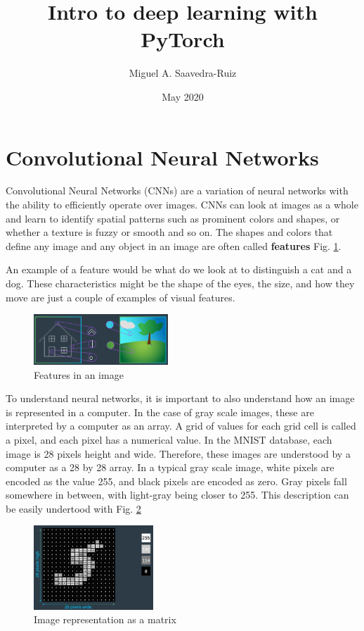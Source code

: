 \documentclass{article}
\title{Intro to deep learning with PyTorch}
\author{Miguel A. Saavedra-Ruiz}
\date{May 2020}
\begin{document}
\maketitle

\section*{Convolutional Neural Networks}

Convolutional Neural Networks (CNNs) are a variation of neural networks with the ability to efficiently operate over images. CNNs can look at images as a whole and learn to identify spatial patterns such as prominent colors and shapes, or whether a texture is fuzzy or smooth and so on. The shapes and colors that define any image and any object in an image are often called \textbf{features} Fig. \ref{fig:f1}.

An example of a feature would be what do we look at to distinguish a cat and a dog. These characteristics might be the shape of the eyes, the size, and how they move are just a couple of examples of visual features. 

\begin{figure}[ht]
    \centering
    \includegraphics[width=0.45\textwidth,height=0.45\textheight,keepaspectratio]{images/features.png}
    \captionsetup{justification=centering}
    \caption{Features in an image}
    \label{fig:f1}
\end{figure}

To understand neural networks, it is important to also understand how an image is represented in a computer. In the case of gray scale images, these are interpreted by a computer as an array. A grid of values for each grid cell is called a pixel, and each pixel has a numerical value. In the MNIST database, each image is 28 pixels height and wide. Therefore, these images are understood by a computer as a 28 by 28 array. In a typical gray scale image, white pixels are encoded as the value 255, and black pixels are encoded as zero. Gray pixels fall somewhere in between, with light-gray being closer to 255. This description can be easily undertood with Fig. \ref{fig:f2}

\begin{figure}[ht]
    \centering
    \includegraphics[width=0.4\textwidth,height=0.4\textheight,keepaspectratio]{images/image_representation.png}
    \captionsetup{justification=centering}
    \caption{Image representation as a matrix}
    \label{fig:f2}
\end{figure}
\end{document}
